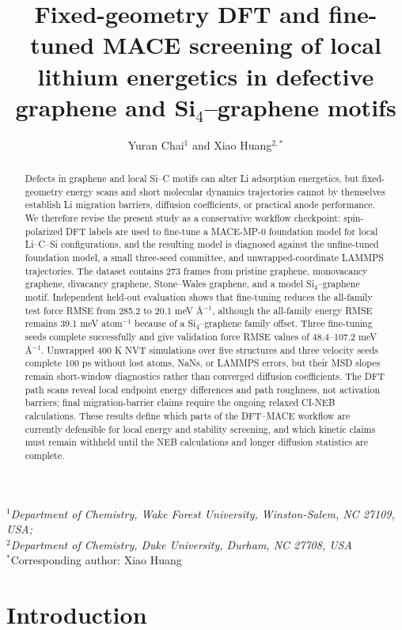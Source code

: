 \documentclass[12pt]{article}
\title{Fixed-geometry DFT and fine-tuned MACE screening of local lithium energetics in defective graphene and Si$_4$--graphene motifs}
\author{Yuran Chai$^1$ and Xiao Huang$^{2,*}$}
\date{}
\begin{document}
\maketitle
\begin{center}
    \textit{$^1$Department of Chemistry, Wake Forest University, Winston-Salem, NC 27109, USA;\\
    $^2$Department of Chemistry, Duke University, Durham, NC 27708, USA}\\
    $^*$Corresponding author: Xiao Huang
\end{center}

\begin{abstract}
Defects in graphene and local Si--C motifs can alter Li adsorption energetics, but fixed-geometry energy scans and short molecular dynamics trajectories cannot by themselves establish Li migration barriers, diffusion coefficients, or practical anode performance. We therefore revise the present study as a conservative workflow checkpoint: spin-polarized DFT labels are used to fine-tune a MACE-MP-0 foundation model for local Li--C--Si configurations, and the resulting model is diagnosed against the unfine-tuned foundation model, a small three-seed committee, and unwrapped-coordinate LAMMPS trajectories. The dataset contains 273 frames from pristine graphene, monovacancy graphene, divacancy graphene, Stone--Wales graphene, and a model Si$_4$--graphene motif. Independent held-out evaluation shows that fine-tuning reduces the all-family test force RMSE from 285.2 to 20.1 meV \AA$^{-1}$, although the all-family energy RMSE remains 39.1 meV atom$^{-1}$ because of a Si$_4$--graphene family offset. Three fine-tuning seeds complete successfully and give validation force RMSE values of 48.4--107.2 meV \AA$^{-1}$. Unwrapped 400 K NVT simulations over five structures and three velocity seeds complete 100 ps without lost atoms, NaNs, or LAMMPS errors, but their MSD slopes remain short-window diagnostics rather than converged diffusion coefficients. The DFT path scans reveal local endpoint energy differences and path roughness, not activation barriers; final migration-barrier claims require the ongoing relaxed CI-NEB calculations. These results define which parts of the DFT--MACE workflow are currently defensible for local energy and stability screening, and which kinetic claims must remain withheld until the NEB calculations and longer diffusion statistics are complete.
\end{abstract}

\section{Introduction}
\end{document}
